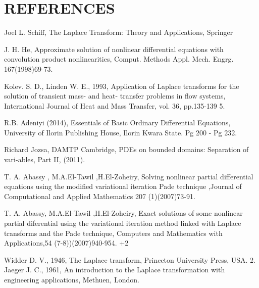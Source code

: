 \documentclass[11pt]{report}
\begin{document}
	\chapter*{REFERENCES}
	\begin{description}
		\item Joel L. Schiff, The Laplace Transform: Theory and Applications, Springer
		
		\item J. H. He, Approximate solution of nonlinear differential equations with convolution product nonlinearities, Comput. Methods Appl. Mech. Engrg. 167(1998)69-73.
		
		\item  Kolev. S. D., Linden W. E., 1993, Application of Laplace transforms for the solution of transient mass- and heat- transfer problems in flow systems, International Journal of Heat and Mass Transfer, vol. 36, pp.135-139 5. 
		
		\item R.B. Adeniyi (2014), Essentials of Basic Ordinary Differential Equations, University of Ilorin Publishing House, Ilorin Kwara State. Pg 200 - Pg 232.
		
		\item Richard Jozsa, DAMTP Cambridge, PDEs on bounded domains: Separation of vari-ables, Part II, (2011).
		
		\item T. A. Abassy , M.A.El-Tawil ,H.El-Zoheiry, Solving nonlinear partial differential equations using the modified
		variational iteration Pade technique ,Journal of Computational and Applied Mathematics 207 (1)(2007)73-91.
		
		\item T. A. Abassy, M.A.El-Tawil ,H.El-Zoheiry, Exact solutions of some nonlinear partial diferential using the
		variational iteration method linked with Laplace transforms and the Pade technique, Computers and Mathematics
		with Applications,54 (7-8))(2007)940-954.
		+2
		\item Widder D. V., 1946, The Laplace transform, Princeton University Press, USA. 2. Jaeger J. C., 1961, An introduction to the Laplace transformation with engineering applications, Methuen, London. 
	\end{description}
\end{document}
